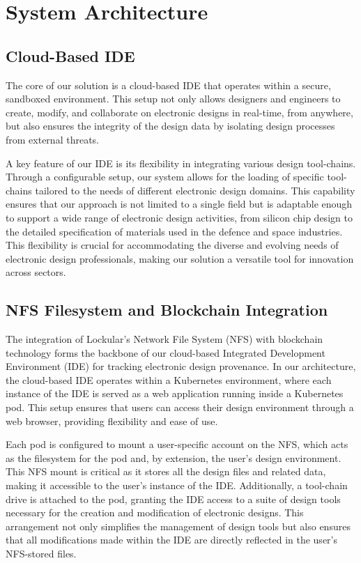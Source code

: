 \documentclass{tufte-handout}
\begin{document}
\section{System Architecture}
\subsection{Cloud-Based IDE}
The core of our solution is a cloud-based IDE that operates within a secure, sandboxed environment. This setup not only allows designers and engineers to create,
modify, and collaborate on electronic designs in real-time, from anywhere, but also ensures the integrity of the design data by isolating design processes from
external threats. 

A key feature of our IDE is its flexibility in integrating various design tool-chains. Through a configurable setup, our system allows for the loading of
specific tool-chains tailored to the needs of different electronic design domains. This capability ensures that our approach is not limited to a single
field but is adaptable enough to support a wide range of electronic design activities, from silicon chip design to the detailed specification of materials
used in the defence and space industries. This flexibility is crucial for accommodating the diverse and evolving needs of electronic design professionals,
making our solution a versatile tool for innovation across sectors.

\subsection{NFS Filesystem and Blockchain Integration}
The integration of Lockular's Network File System (NFS) with blockchain technology forms the backbone of our cloud-based Integrated Development Environment (IDE) for
tracking electronic design provenance. In our architecture, the cloud-based IDE operates within a Kubernetes environment, where each instance of the IDE is
served as a web application running inside a Kubernetes pod. This setup ensures that users can access their design environment through a web browser, providing
flexibility and ease of use.

Each pod is configured to mount a user-specific account on the NFS, which acts as the filesystem for the pod and, by extension, the user's design environment.
This NFS mount is critical as it stores all the design files and related data, making it accessible to the user's instance of the IDE. Additionally, a
tool-chain drive is attached to the pod, granting the IDE access to a suite of design tools necessary for the creation and modification of electronic designs.
This arrangement not only simplifies the management of design tools but also ensures that all modifications made within the IDE are directly reflected in the
user's NFS-stored files.
\end{document}
